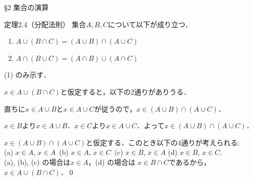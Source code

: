 \documentclass[uplatex,a4paper,dvipdfmx,aspectratio=169,11pt]{beamer}
\begin{document}
\begin{frame}[fragile]{\S 2 集合の演算}
    \begin{block}{定理2.4（分配法則）}
        集合$A, B, C$について以下が成り立つ．
        \begin{enumerate}[(1)]
            \item $A \cup (B \cap C) = (A \cup B) \cap (A \cup C)$
            \item $A \cap (B \cup C) = (A \cap B) \cup (A \cap C)$
        \end{enumerate}
    \end{block}
    \smallskip
     (1) のみ示す．\\
    \smallskip
    \begin{description}[($\subset$)]
        \item[($\subset$)] $x \in A \cup (B \cap C)$と仮定すると，以下の2通りがありうる．%
            \begin{description}[$x \in B \cap C$:]
                \item[$x \in A$:] 直ちに$x \in A \cup B$と$x \in A \cup C$が従うので，$x \in (A \cup B) \cap (A \cup C)$．
                \item[$x \in B \cap C$:] $x \in B$より$x \in A \cup B$．$x \in C$より$x \in A \cup C$．よって$x \in (A \cup B) \cap (A \cup C)$．
            \end{description}
        \item[($\supset$)] $x \in (A \cup B) \cap (A \cup C)$と仮定する．このとき以下の4通りが考えられる:\\
            (a) $x \in A$, $x \in A$\ (b) $x \in A$, $x \in C$\ (c) $x \in B$, $x \in A$ (d) $x \in B$, $x \in C$. \\
            (a), (b), (c) の場合は$x \in A$，(d) の場合は $x \in B \cap C$であるから，$x \in A \cup (B \cap C)$．\qed
    \end{description}
\end{frame}
\end{document}

